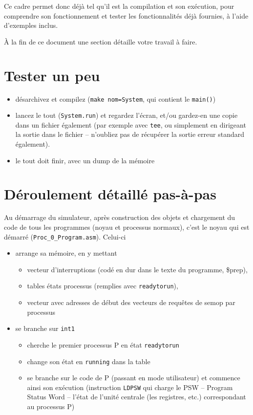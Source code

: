 \documentclass{article}
\begin{document}
Ce cadre permet donc d\'ej\`a tel qu'il est la compilation et son ex\'ecution,
pour comprendre son fonctionnement et tester les fonctionnalit\'es d\'ej\`a
fournies, \`a l'aide d'exemples inclus. 


\`A la fin de ce document une section d\'etaille votre travail \`a
faire.

\section{Tester un peu}

\begin{itemize}
\item d\'esarchivez et compilez (\texttt{make nom=System}, qui contient le \texttt{main()})
\item lancez le tout (\texttt{System.run}) et regardez l'\'ecran, et/ou
  gardez-en une copie dans un fichier \'egalement (par exemple avec
  \texttt{tee}, ou simplement en dirigeant la sortie dans le fichier --
  n'oubliez pas de r\'ecup\'erer la sortie erreur standard \'egalement).
\item le tout doit finir, avec un dump de la m\'emoire 
\end{itemize}

\section{D\'eroulement d\'etaill\'e pas-\`a-pas}

Au d\'emarrage du simulateur, apr\`es construction des objets et chargement du
code de tous les programmes (noyau et processus normaux), c'est le noyau qui est
d\'emarr\'e (\texttt{Proc\_0\_Program.asm}). Celui-ci
\begin{itemize}
\item arrange sa m\'emoire, en y mettant 
\begin{itemize}
 \item vecteur d'interruptions (cod\'e en dur dans le texte du programme, \$prep), 
 \item tables \'etats processus (remplies avec \texttt{readytorun}),
 \item vecteur avec adresses de d\'ebut des vecteurs de requ\^etes de semop
   par processus
\end{itemize}
\item se branche sur \texttt{int1}
\begin{itemize}
 \item cherche le premier processus P en \'etat \texttt{readytorun}
\item change son \'etat en \texttt{running} dans la table
\item se branche sur le code de P (passant en mode utilisateur) et commence
  ainsi son ex\'ecution (instruction \texttt{LDPSW} qui charge le PSW --
  Program Status Word -- l'\'etat de l'unit\'e centrale (les registres, etc.)
  correspondant au processus P)
\end{itemize}
\end{itemize}
\end{document}
